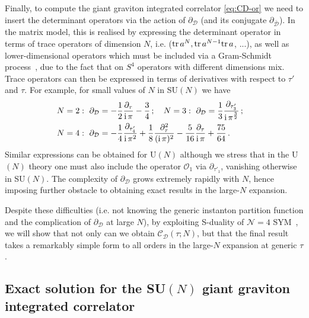 \documentclass[aps,prl,twocolumn, longbibliography,footinbib,superscriptaddress, preprintnumbers]{revtex4-1}
\newcommand{\<}{\langle}
\renewcommand{\>}{\rangle}
\def\tr{{\rm tr}}
\begin{document}
Finally, to compute the giant graviton integrated correlator \eqref{eq:CD-or} we need to insert the determinant operators via the action of $\partial_{\mathcal{D} }$ (and its conjugate $ \partial_{\bar {\mathcal{D} } } $). In the matrix model, this is realised by expressing the determinant operator in terms of trace operators of dimension $N$, i.e. ($\tr\, a^N, \tr\, a^{N-1} \tr\, a$, ...), as well as lower-dimensional operators which must be included via a Gram-Schmidt process~\cite{Gerchkovitz:2016gxx}, due to the fact that on $S^4$ operators with different dimensions mix.  Trace operators can then be expressed in terms of derivatives with respect to $\tau'$ and $\tau$. For example, for small values of $N$ in SU$(N)$ we have
\begin{align}
N&=2: \, \,  \partial_{\mathcal{D} } = -{1\over 2} \frac{\partial_{\tau}}{{\rm i} \, \pi } - {3 \over 4} \, ;  \quad N=3: \, \,  \partial_{\mathcal{D} } = {1\over 3} \frac{ \partial_{\tau'_3} }{{\rm i} \, \pi^{3\over 2}} \, ;  \cr
N&=4: \, \,  \partial_{\mathcal{D}} =-\frac{1}{4} \frac{ \partial_{\tau'_4}  }{{\rm i} \, \pi^{2}}    +    \frac{1}{8}  {\partial^2_{\tau} \over ({\rm i} \, \pi)^2}-\frac{5}{16} {\partial_{\tau} \over {\rm i} \, \pi }   +\frac{75}{64} \, .  \nonumber
\end{align}
Similar expressions can be obtained for U$(N)$ although we stress that in the U$(N)$ theory one must also include the operator $\mathcal{O}_1$ via $\partial_{\tau'_1}$, vanishing otherwise in SU$(N)$.
The complexity of $ \partial_{\mathcal{D}}$  grows extremely rapidly with $N$, hence imposing further obstacle to obtaining exact results in the large-$N$ expansion.

Despite these difficulties (i.e. not knowing the generic instanton partition function and the complication of $ \partial_{\mathcal{D}}$ at large $N$), by exploiting S-duality of $\mathcal{N}=4$ SYM~\cite{Montonen:1977sn}, we will show that not only can we obtain $\mathcal{C}_{\mathcal{D}}(\tau; N)$, but that the final result takes a remarkably simple form to all orders in the large-$N$ expansion at generic $\tau$.

\vspace{-0.4cm}
\subsection{ Exact solution for the SU$(N)$ giant graviton integrated correlator}
\vspace{-0.2cm}
\end{document}
